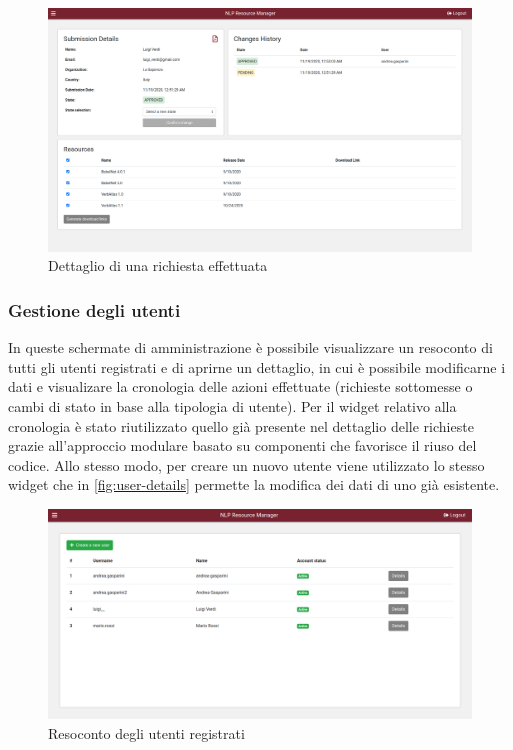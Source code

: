 \begin{figure}[H]
	\centering
	\includegraphics[width=\textwidth]{assets/ui/submission-details.png}
	\caption{Dettaglio di una richiesta effettuata}
	\label{fig:submission-details}
\end{figure}

\subsubsection{Gestione degli utenti}
In queste schermate di amministrazione è possibile visualizzare un resoconto di
tutti gli utenti registrati e di aprirne un dettaglio, in cui è possibile modificarne
i dati e visualizare la cronologia delle azioni effettuate (richieste sottomesse
o cambi di stato in base alla tipologia di utente). Per il widget relativo alla
cronologia è stato riutilizzato quello già presente nel dettaglio delle richieste
grazie all'approccio modulare basato su componenti che favorisce il riuso del codice.
Allo stesso modo, per creare un nuovo utente viene utilizzato lo stesso widget
che in \autoref{fig:user-details} permette la modifica dei dati di uno già esistente.

\begin{figure}[H]
	\centering
	\includegraphics[width=\textwidth]{assets/ui/users-list.png}
	\caption{Resoconto degli utenti registrati}
	\label{fig:users-list}
\end{figure}

